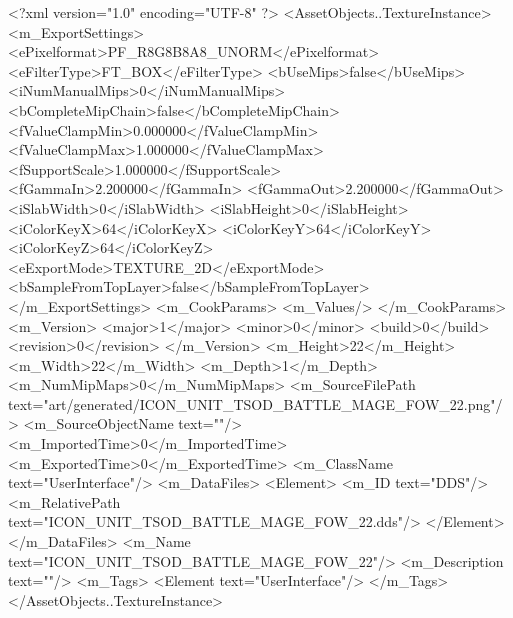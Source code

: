 <?xml version="1.0" encoding="UTF-8" ?>
<AssetObjects..TextureInstance>
	<m_ExportSettings>
		<ePixelformat>PF_R8G8B8A8_UNORM</ePixelformat>
		<eFilterType>FT_BOX</eFilterType>
		<bUseMips>false</bUseMips>
		<iNumManualMips>0</iNumManualMips>
		<bCompleteMipChain>false</bCompleteMipChain>
		<fValueClampMin>0.000000</fValueClampMin>
		<fValueClampMax>1.000000</fValueClampMax>
		<fSupportScale>1.000000</fSupportScale>
		<fGammaIn>2.200000</fGammaIn>
		<fGammaOut>2.200000</fGammaOut>
		<iSlabWidth>0</iSlabWidth>
		<iSlabHeight>0</iSlabHeight>
		<iColorKeyX>64</iColorKeyX>
		<iColorKeyY>64</iColorKeyY>
		<iColorKeyZ>64</iColorKeyZ>
		<eExportMode>TEXTURE_2D</eExportMode>
		<bSampleFromTopLayer>false</bSampleFromTopLayer>
	</m_ExportSettings>
	<m_CookParams>
		<m_Values/>
	</m_CookParams>
	<m_Version>
		<major>1</major>
		<minor>0</minor>
		<build>0</build>
		<revision>0</revision>
	</m_Version>
	<m_Height>22</m_Height>
	<m_Width>22</m_Width>
	<m_Depth>1</m_Depth>
	<m_NumMipMaps>0</m_NumMipMaps>
	<m_SourceFilePath text="art/generated/ICON_UNIT_TSOD_BATTLE_MAGE_FOW_22.png"/>
	<m_SourceObjectName text=""/>
	<m_ImportedTime>0</m_ImportedTime>
	<m_ExportedTime>0</m_ExportedTime>
	<m_ClassName text="UserInterface"/>
	<m_DataFiles>
		<Element>
			<m_ID text="DDS"/>
			<m_RelativePath text="ICON_UNIT_TSOD_BATTLE_MAGE_FOW_22.dds"/>
		</Element>
	</m_DataFiles>
	<m_Name text="ICON_UNIT_TSOD_BATTLE_MAGE_FOW_22"/>
	<m_Description text=""/>
	<m_Tags>
		<Element text="UserInterface"/>
	</m_Tags>
</AssetObjects..TextureInstance>
